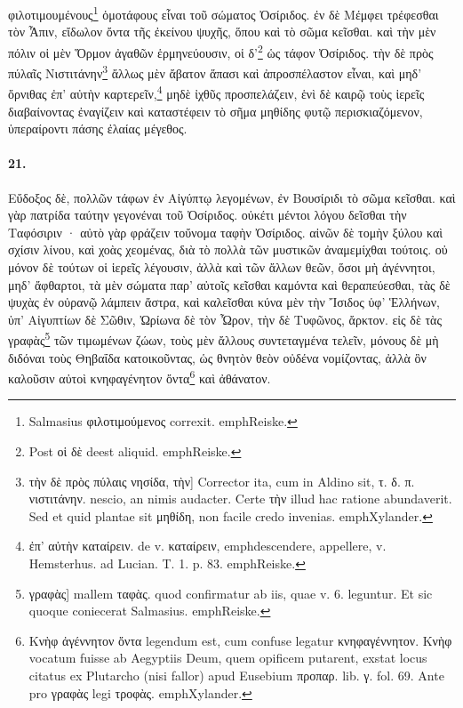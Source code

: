 \documentclass[a4paper, 11pt, oneside, polutonikogreek, german]{article}
\begin{document}
φιλοτιμουμένους\footnote{Salmasius φιλοτιμούμενος correxit. emph{Reiske.}} ὁμοτάφους εἶναι τοῦ σώματος Ὀσίριδος. ἐν δὲ Μέμφει τρέφεσθαι τὸν Ἆπιν, εἴδωλον ὄντα τῆς ἐκείνου ψυχῆς, ὅπου καὶ τὸ σῶμα κεῖσθαι. καὶ τὴν μὲν πόλιν οἱ μὲν Ὅρμον ἀγαθῶν ἑρμηνεύουσιν, οἱ δ'\footnote{Post οἱ δὲ deest aliquid. emph{Reiske.}} ὡς τάφον Ὀσίριδος. τὴν δὲ πρὸς πύλαῖς Νιστιτάνην\footnote{τὴν δὲ πρὸς πύλαις νησίδα, τὴν] Corrector ita, cum in Aldino sit, τ. δ. π. νιστιτάνην. nescio, an nimis audacter. Certe τὴν illud hac ratione abundaverit. Sed et quid plantae sit μηθίδη, non facile credo invenias. emph{Xylander.}} ἄλλως μὲν ἄβατον ἅπασι καὶ ἀπροσπέλαστον εἶναι, καὶ μηδ' ὄρνιθας ἐπ' αὐτὴν καρτερεῖν,\footnote{ἐπ' αὐτὴν καταίρειν. de v. καταίρειν, emph{descendere, appellere}, v. Hemsterhus. ad Lucian. T. 1. p. 83. emph{Reiske.}} μηδὲ ἰχθῦς προσπελάζειν, ἑνὶ δὲ καιρῷ τοὺς ἱερεῖς διαβαίνοντας ἐναγίζειν καὶ καταστέφειν τὸ σῆμα μηθίδης φυτῷ περισκιαζόμενον, ὑπεραίροντι πάσης ἐλαίας μέγεθος.

\paragraph{21.}
Εὔδοξος δὲ, πολλῶν τάφων ἐν Αἰγύπτῳ λεγομένων, ἐν Βουσίριδι τὸ σῶμα κεῖσθαι. καὶ γὰρ πατρίδα ταύτην γεγονέναι τοῦ Ὀσίριδος. οὐκέτι μέντοι λόγου δεῖσθαι τὴν Ταφόσιριν · αὐτὸ γὰρ φράζειν τοὔνομα ταφὴν Ὀσίριδος. αἰνῶν δὲ τομὴν ξύλου καὶ σχίσιν λίνου, καὶ χοὰς χεομένας, διὰ τὸ πολλὰ τῶν μυστικῶν ἀναμεμίχθαι τούτοις. οὐ μόνον δὲ τούτων οἱ ἱερεῖς λέγουσιν, ἀλλὰ καὶ τῶν ἄλλων θεῶν, ὅσοι μὴ ἀγέννητοι, μηδ' ἄφθαρτοι, τὰ μὲν σώματα παρ' αὐτοῖς κεῖσθαι καμόντα καὶ θεραπεύεσθαι, τὰς δὲ ψυχὰς ἐν οὐρανῷ λάμπειν ἄστρα, καὶ καλεῖσθαι κύνα μὲν τὴν Ἴσιδος ὑφ' Ἑλλήνων, ὑπ' Αἰγυπτίων δὲ Σῶθιν, Ὠρίωνα δὲ τὸν Ὦρον, τὴν δὲ Τυφῶνος, ἄρκτον. εἰς δὲ τὰς γραφὰς\footnote{γραφὰς] mallem ταφὰς. quod confirmatur ab iis, quae v. 6. leguntur. Et sic quoque coniecerat Salmasius. emph{Reiske.}} τῶν τιμωμένων ζώων, τοὺς μὲν ἄλλους συντεταγμένα τελεῖν, μόνους δὲ μὴ διδόναι τοὺς Θηβαΐδα κατοικοῦντας, ὡς θνητὸν θεὸν οὐδένα νομίζοντας, ἀλλὰ ὃν καλοῦσιν αὐτοὶ κνηφαγένητον ὄντα\footnote{Κνὴφ ἀγέννητον ὄντα legendum est, cum confuse legatur κνηφαγέννητον. Κνὴφ vocatum fuisse ab Aegyptiis Deum, quem opificem putarent, exstat locus citatus ex Plutarcho (nisi fallor) apud Eusebium προπαρ. lib. γ. fol. 69. Ante pro γραφὰς legi τροφὰς. emph{Xylander.}} καὶ ἀθάνατον.
\end{document}
